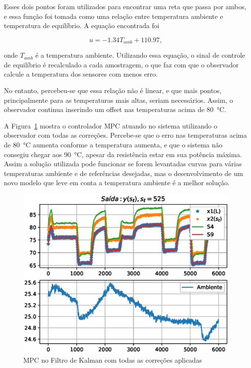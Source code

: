Esses dois pontos foram utilizados para encontrar uma reta que passa por ambos,
e essa função foi tomada como uma relação entre temperatura ambiente e
temperatura de equilíbrio. A equação encontrada foi

\begin{equation}
	u = -1.34 T_{amb} + 110.97,
\end{equation}

onde \(T_{amb}\) é a temperatura ambiente. Utilizando essa equação, o sinal de
controle de equilíbrio é recalculado a cada amostragem, o que faz com que o
observador calcule a temperatura dos sensores com menos erro.

No entanto, percebeu-se que essa relação não é linear, e que mais pontos,
principalmente para as temperaturas mais altas, seriam necessários. Assim, o
observador continua inserindo um offset nas temperaturas acima de
\SI{80}{\degreeCelsius}.

A Figura~\ref{fig:kalman-atual} mostra o controlador MPC atuando no sistema
utilizando o observador com todas as correções. Percebe-se que o erro nas
temperaturas acima de \SI{80}{\degreeCelsius} aumenta conforme a temperatura
aumenta, e que o sistema não consegiu chegar aos \SI{90}{\degreeCelsius}, apesar
da resistência estar em sua potência máxima. Assim a solução utilizada pode
funcionar se forem levantadas curvas para várias temperaturas ambiente e de
referências desejadas, mas o desenvolvimento de um novo modelo que leve em conta
a temperatura ambiente é a melhor solução.

\begin{figure}[ht!]
	\centering
	\captionsetup{justification=centering}
	\includegraphics[height=0.5\linewidth]{imgs/kalman-atual}
	\caption{MPC no Filtro de Kalman com todas as correções aplicadas}%
	\label{fig:kalman-atual}
\end{figure}

